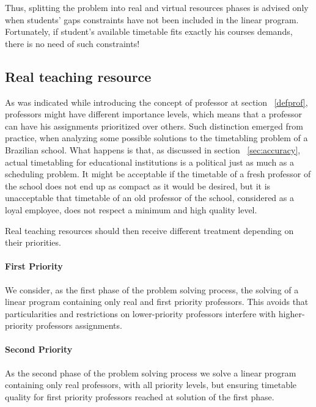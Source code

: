 Thus, splitting the problem into real and virtual resources phases is advised only when students' gaps constraints have not been included in the linear program. Fortunately, if student's available timetable fits exactly his courses demands, there is no need of such constraints!


\subsection{Real teaching resource}

As was indicated while introducing the concept of professor at section ~\ref{defprof}, professors might have different importance levels, which means that a professor can have his assignments prioritized over others. Such distinction emerged from practice, when analyzing some possible solutions to the timetabling problem of a Brazilian school. What happens is that, as discussed in section ~\ref{sec:accuracy}, actual timetabling for educational institutions is a political just as much as a scheduling problem. It might be acceptable if the timetable of a fresh professor of the school does not end up as compact as it would be desired, but it is unacceptable that timetable of an old professor of the school, considered as a loyal employee, does not respect a minimum and high quality level.

Real teaching resources should then receive different treatment depending on their priorities.

\paragraph{First Priority}

We consider, as the first phase of the problem solving process, the solving of a linear program containing only real and first priority professors. This avoids that particularities and restrictions on lower-priority professors interfere with higher-priority professors assignments.

\paragraph{Second Priority}

As the second phase of the problem solving process we solve a linear program containing only real professors, with all priority levels, but ensuring timetable quality for first priority professors reached at solution of the first phase.


